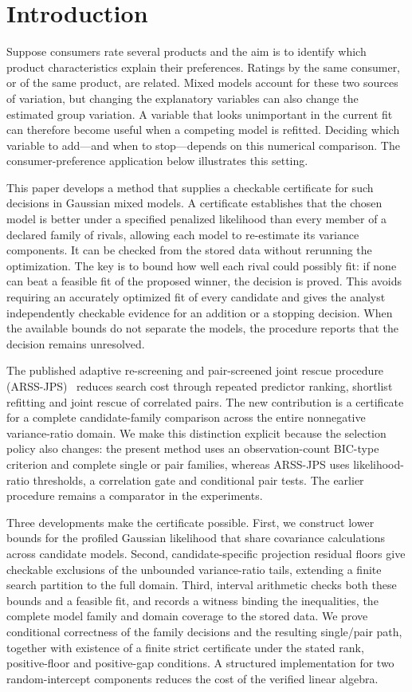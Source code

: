 \documentclass[preprint,11pt,numbers]{elsarticle}
\theoremstyle{remark}\newtheorem{remark}[theorem]{Remark}
\begin{document}
\section{Introduction}
Suppose consumers rate several products and the aim is to identify which
product characteristics explain their preferences. Ratings by the same
consumer, or of the same product, are related. Mixed models account for these
two sources of variation, but changing the explanatory variables can also
change the estimated group variation. A variable that looks unimportant in
the current fit can therefore become useful when a competing model is refitted.
Deciding which variable to add---and when to stop---depends on this numerical
comparison. The consumer-preference application below illustrates this setting.

This paper develops a method that supplies a checkable certificate for such
decisions in Gaussian mixed models. A certificate establishes that the chosen
model is better under a specified penalized likelihood than every member of a
declared family of rivals, allowing each model to re-estimate its variance
components. It can be checked from the stored data without rerunning the
optimization. The key is to bound how well each rival could possibly fit:
if none can beat a feasible fit of the proposed winner, the decision is proved.
This avoids requiring an accurately optimized fit of every candidate and gives
the analyst independently checkable evidence for an addition or a stopping
decision. When the available bounds do not separate the models, the procedure
reports that the decision remains unresolved.

The published adaptive re-screening and pair-screened joint rescue procedure
(ARSS-JPS)~\cite{arss} reduces search cost through repeated predictor ranking,
shortlist refitting and joint rescue of correlated pairs. The new contribution
is a certificate for a complete candidate-family comparison across the entire
nonnegative variance-ratio domain. We make this distinction explicit because
the selection policy also changes: the present method uses an observation-count
BIC-type criterion and complete single or pair families, whereas ARSS-JPS uses
likelihood-ratio thresholds, a correlation gate and conditional pair tests.
The earlier procedure remains a comparator in the experiments.

Three developments make the certificate possible. First, we construct lower
bounds for the profiled Gaussian likelihood that share covariance calculations
across candidate models. Second, candidate-specific projection residual floors
give checkable exclusions of the unbounded variance-ratio tails, extending a
finite search partition to the full domain. Third, interval arithmetic checks
both these bounds and a feasible fit, and records a witness binding the
inequalities, the complete model family and domain coverage to the stored data.
We prove conditional correctness of the family decisions and the resulting
single/pair path, together with existence of a finite strict certificate under
the stated rank, positive-floor and positive-gap conditions. A structured
implementation for two random-intercept components reduces the cost of the
verified linear algebra.
\end{document}
